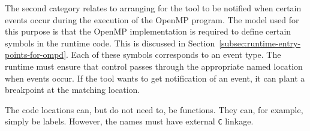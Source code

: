 The second category relates to arranging for the tool to be notified
when certain events occur during the execution of the OpenMP program.
The model used for this purpose is that the OpenMP implementation
is required to define certain symbols in the runtime code.
This is discussed in Section~\ref{subsec:runtime-entry-points-for-ompd}.
Each of these symbols corresponds to an event type.
The runtime must ensure that control passes through the appropriate
named location when events occur.
If the tool wants to get notification of an event, it can plant
a breakpoint at the matching location.

The code locations can, but do not need to, be functions.
They can, for example, simply be labels.
However, the names must have external \texttt{C} linkage.

